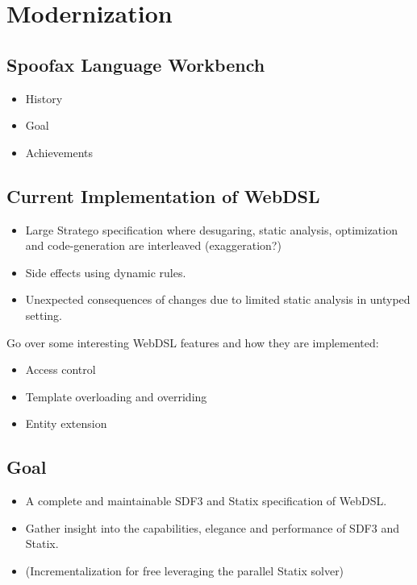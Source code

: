 
\chapter{\label{chap:modernization}Modernization}

  \section{Spoofax Language Workbench}

    \begin{itemize}
      \item History
      \item Goal
      \item Achievements
    \end{itemize}

  \section{Current Implementation of WebDSL}

    \begin{itemize}
      \item Large Stratego specification where desugaring, static analysis, optimization and code-generation are interleaved (exaggeration?)
      \item Side effects using dynamic rules.
      \item Unexpected consequences of changes due to limited static analysis in untyped setting.
    \end{itemize}

    Go over some interesting WebDSL features and how they are implemented:
    \begin{itemize}
      \item Access control
      \item Template overloading and overriding
      \item Entity extension
    \end{itemize}

  \section{Goal}

    \begin{itemize}
      \item A complete and maintainable SDF3 and Statix specification of WebDSL.
      \item Gather insight into the capabilities, elegance and performance of SDF3 and Statix.
      \item (Incrementalization for free leveraging the parallel Statix solver)
    \end{itemize}
